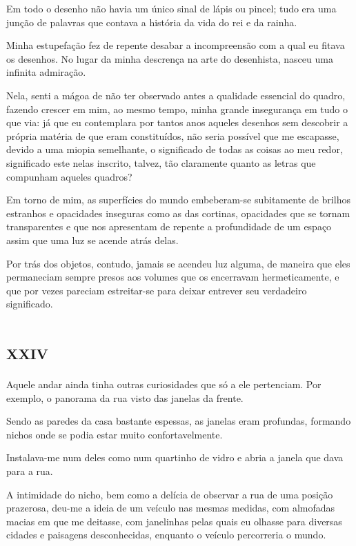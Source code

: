 Em todo o desenho não havia um único sinal de lápis ou pincel; tudo era uma junção de palavras que contava a história da vida do rei e da rainha.

Minha estupefação fez de repente desabar a incompreensão com a qual eu fitava os desenhos. No lugar da minha descrença na arte do desenhista, nasceu uma infinita admiração.

Nela, senti a mágoa de não ter observado antes a qualidade essencial do quadro, fazendo crescer em mim, ao mesmo tempo, minha grande insegurança em tudo o que via: já que eu contemplara por tantos anos aqueles desenhos sem descobrir a própria matéria de que eram constituídos, não seria possível que me escapasse, devido a uma miopia semelhante, o significado de todas as coisas ao meu redor, significado este nelas inscrito, talvez, tão claramente quanto as letras que compunham aqueles quadros?

Em torno de mim, as superfícies do mundo embeberam-se subitamente de brilhos estranhos e opacidades inseguras como as das cortinas, opacidades que se tornam transparentes e que nos apresentam de repente a profundidade de um espaço assim que uma luz se acende atrás delas.

Por trás dos objetos, contudo, jamais se acendeu luz alguma, de maneira que eles permaneciam sempre presos aos volumes que os encerravam hermeticamente, e que por vezes pareciam estreitar-se para deixar entrever seu verdadeiro significado.


\chapter*{\huge\centering\textsc{xxiv}}

Aquele andar ainda tinha outras curiosidades que só a ele pertenciam. Por exemplo, o panorama da rua visto das janelas da frente.

Sendo as paredes da casa bastante espessas, as janelas eram profundas, formando nichos onde se podia estar muito confortavelmente.

Instalava-me num deles como num quartinho de vidro e abria a janela que dava para a rua. 

A intimidade do nicho, bem como a delícia de observar a rua de uma posição prazerosa, deu-me a ideia de um veículo nas mesmas medidas, com almofadas macias em que me deitasse, com janelinhas pelas quais eu olhasse para diversas cidades e paisagens desconhecidas, enquanto o veículo percorreria o mundo.

